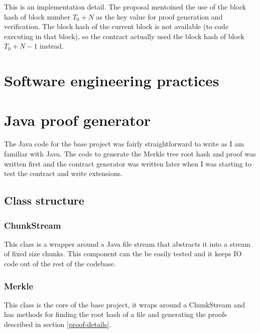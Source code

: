 \documentclass[12pt,a4paper,twoside,openright]{report}
\begin{document}
This is an implementation detail. The proposal mentoined the use of the block hash of block number $T_0 + N$ as the key value for proof generation and verification.
The block hash of the current block is not available (to code executing in that block), so the contract actually used the block hash of block $T_0 + N - 1$ instead.


\section{Software engineering practices}



\section{Java proof generator}



The Java code for the base project was fairly straightforward to write as I am familiar with Java.
The code to generate the Merkle tree root hash and proof was written first and the contract generator was written later when I was starting to test the contract and write extensions.

\subsection{Class structure}
\subsubsection{ChunkStream}

This class is a wrapper around a Java file stream that abstracts it into a stream of fixed size chunks.
This component can the be easily tested and it keeps IO code out of the rest of the codebase.

\subsubsection{Merkle}
\label{pseudo-code}
This class is the core of the base project, it wraps around a ChunkStream and has methods for finding the root hash of a file and generating the proofs described in section \ref{proof-details}.
\end{document}
